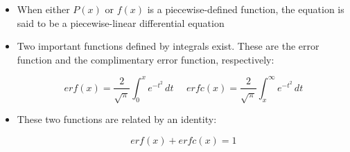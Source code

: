 \documentclass[12pt]{article}
\begin{document}
\begin{itemize}
    \item When either $P(x)$ or $f(x)$ is a piecewise-defined function, the equation is said to be a piecewise-linear differential equation

    \item Two important functions defined by integrals exist. These are the error function and the complimentary error function, respectively:

      $$erf(x)=\frac{2}{\sqrt{\pi}}\int_0^x e^{-t^2}\,dt\,\,\,\,\,\,\,\, erfc(x)=\frac{2}{\sqrt{\pi}}\int_x^{\infty} e^{-t^2}\,dt$$
      
    \item These two functions are related by an identity:

      $$erf(x)+erfc(x)=1$$

\end{itemize}
\end{document}
